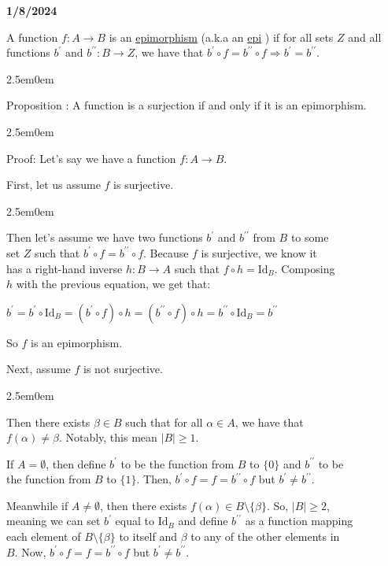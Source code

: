 \documentclass{book}
\newcommand{\hOne}{%
   \color{Black}%
   \fontsize{14}{16}\selectfont%
}
\newcommand{\hTwo}{%
   \color{MidnightBlue}%
   \fontsize{13}{15}\selectfont%
}
\newcommand{\hThree}{%
   \color{PineGreen!85!Orange}
   \fontsize{13}{15}\selectfont%
}
\newenvironment{myIndent}{%
   \begin{adjustwidth}{2.5em}{0em}%
}{%
   \end{adjustwidth}%
}
\newcommand{\udefine}[1]{{%
   \setulcolor{Red}%
   \setul{0.14em}{0.07em}%
   \ul{#1}%
}}
\newcommand*{\markDate}[1]{%
   {\huge \color{Black} \textbf{#1} \newline}%
}
\newcommand{\pprime}{{\prime\prime}}
\newcommand{\myId}{\mathrm{Id}}
\newcounter{PropNumber}
\newcommand{\propCount}{%
   \stepcounter{PropNumber}%
   \thePropNumber%
}
\newcommand{\retTwo}{\hfill\bigbreak}
\begin{document}
   \markDate{1/8/2024}

   \hOne
   A function $f: A \rightarrow B$ is an \udefine{epimorphism} 
   (a.k.a an \udefine{epi}) if for all sets $Z$ and all\\ functions $b^{\prime}$
   and $b^{\pprime}: B \rightarrow Z$, we have that 
   $b^{\prime} \circ f = b^{\pprime} \circ f \Rightarrow 
   b^{\prime} = b^{\pprime}$.

   
   \begin{myIndent}
      \hTwo
      Proposition \propCount: A function is a surjection if and
      only if it is an epimorphism.
      
      \hThree
      \begin{myIndent}
         Proof: Let's say we have a function $f: A \rightarrow B$.
         \hfill \bigbreak

         First, let us assume $f$ is surjective.
         \begin{myIndent}
               Then let's assume we have two functions $b^\prime$ and $b^\pprime$ from $B$ to some\\ set $Z$ such that $b^\prime \circ f = b^\pprime \circ f$. Because $f$ is surjective, we know it\\ has a right-hand inverse $h: B \rightarrow A$ such that $f \circ h = \myId_B$. Composing\\ $h$ with the previous equation, we get that:

               {\center $b^{\prime} = b^{\prime} \circ \myId_B = (b^\prime \circ f) \circ h = (b^\pprime \circ f) \circ h = b^\pprime \circ \myId_B = b^\pprime$\retTwo\par}

               So $f$ is an epimorphism.\retTwo
         \end{myIndent}

         Next, assume $f$ is not surjective.
         \begin{myIndent}
            Then there exists $\beta \in B$ such that for all $\alpha \in A$, we have that\\ $f(\alpha) \neq \beta$. Notably, this mean $|B| \geq 1$.\retTwo
            
            If $A = \emptyset$, then define $b^\prime$ to be the function from $B$ to $\{0\}$ and $b^\pprime$ to be\\ the function from $B$ to $\{1\}$. Then, $b^\prime \circ f = f = b^\pprime \circ f$ but $b^\prime \neq b^\pprime$.\retTwo
            
            Meanwhile if $A \neq \emptyset$, then there exists $f(\alpha) \in B \setminus \{\beta\}$. So, $|B| \geq 2$,\\ meaning we can set $b^\prime$ equal to $\myId_B$ and define $b^\pprime$ as a function mapping\\ each element of $B \setminus \{\beta \}$ to itself and $\beta$ to any of the other elements in\\ $B$. Now,
            $b^\prime \circ f = f = b^\pprime \circ f$ but $b^\prime \neq b^\pprime$.\retTwo
            

\end{myIndent}
\end{myIndent}
\end{myIndent}
\end{document}
